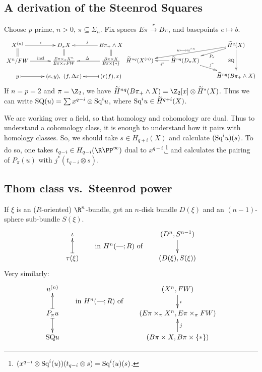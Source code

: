 \documentclass[11pt]{article}
\newcommand{\KanSemResponse}[1]
{
\thispagestyle{fancy}
\subsection*{#1}
}
\begin{document}
\begin{SteenrodTalk}
\KanSemResponse
{A derivation of the Steenrod Squares}
Choose $p$ prime, $n>0$, $\pi\subseteq \Sigma_n$. Fix spaces $E\pi\overset{r}{\to} B\pi$, and basepoints $e\mapsto b$.
\[\xymatrix@R=.3cm{
X^{(n)}\ar[r]^i\ar@{=}[d]&D_\pi X\ar@{=}[d]&\ar[l]_jB\pi_+\wedge X\ar@{=}[d]\\
X^n/FW\ar[r]^{\text{incl}}&\frac{E\pi\times_\pi X^n}{E\pi\times_\pi FW}&
\ar[l]_\Delta\frac{B\pi\times X}{B\pi\times\{*\}}\\
y\ar@{|->}[r]&(e,y),\ (f,\Delta x)&\ar@{|->}[l](r(f),x)
}
\xymatrix@R=.3cm{
&&\widetilde H^q(X)\ar[lld]_{u\mapsto u^{\wedge n}}\ar[ld]^{P_\pi}
\ar[dd]_{\text{SQ}}\\
\widetilde H^{nq}(X^{(n)})&\ar[l]^{i^*}\widetilde H^{nq}(D_\pi X)
\ar[rd]^{j^*}\\
&&\widetilde H^{nq}(B\pi_+\wedge X)
}
\]
If $n=p=2$ and $\pi=\Z_2$, we have $\widetilde H^{nq}(B\pi_+\wedge X)=\Z_2[x]\otimes \widetilde H^*(X)$. Thus we can write $\text{SQ}(u)=\sum x^{q-i}\otimes\textup{Sq}^iu$, where $\textup{Sq}^iu\in \widetilde H^{q+i}(X)$.

We are working over a field, so that homology and cohomology are dual. Thus to understand a cohomology class, it is enough to understand how it pairs with homology classes. So, we should take $s\in H_{q+i}(X)$ and calculate $(\textup{Sq}^iu)(s)$. To do so, one takes $t_{q-i}\in H_{q-i}(\RP^\infty)$ dual to $x^{q-i}$,\footnote{$(x^{q-i}\otimes \textup{Sq}^i(u))(t_{q-i}\otimes s)=\textup{Sq}^i(u)(s)$.}
and calculates the pairing of $P_\pi(u)$ with $j^*(t_{q-i}\otimes s)$.

\subsection*{Thom class vs.\ Steenrod power}
If $\xi$ is an ($R$-oriented) $\R^n$-bundle, get an $n$-disk bundle $D(\xi)$ and an $(n-1)$-sphere sub-bundle $S(\xi)$.
\[\xymatrix@!0@R=12mm@C=2.5cm{
\iota\\
\tau(\xi)\ar@{|->}[u]
}
\raisebox{-.6cm}{\qquad in $H^n(\DASH;R)$ of\qquad}
\xymatrix@!0@R=12mm@C=2.5cm{
(D^n,S^{n-1})\ar[d]\\
(D(\xi),S(\xi))
}\]
Very similarly:
\[\xymatrix@!0@R=12mm@C=2.5cm{
u^{(n)}\\
P_\pi u\ar@{|->}[u]\ar@{|->}[d]\\
\text{SQ}u
}
\raisebox{-.6cm}{\qquad in $H^n(\DASH;R)$ of\qquad}
\xymatrix@!0@R=12mm@C=2.5cm{
(X^n,FW)\ar[d]^i\\
(E\pi\times_\pi X^n,E\pi\times_\pi FW)\\
(B\pi\times X,B\pi\times\{*\})\ar[u]_j
}\]


\end{SteenrodTalk}
\end{document}
